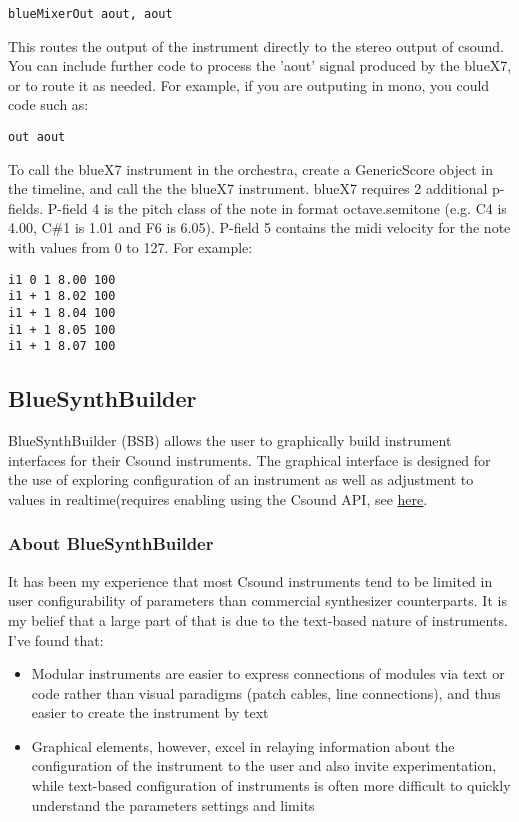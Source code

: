 \begin{verbatim}
blueMixerOut aout, aout
\end{verbatim}

This routes the output of the instrument directly to the stereo output
of csound. You can include further code to process the 'aout' signal
produced by the blueX7, or to route it as needed. For example, if you
are outputing in mono, you could code such as:

\begin{verbatim}
out aout
\end{verbatim}

To call the blueX7 instrument in the orchestra, create a GenericScore
object in the timeline, and call the the blueX7 instrument. blueX7
requires 2 additional p-fields. P-field 4 is the pitch class of the note
in format octave.semitone (e.g. C4 is 4.00, C\#1 is 1.01 and F6 is
6.05). P-field 5 contains the midi velocity for the note with values
from 0 to 127. For example:

\begin{verbatim}
i1 0 1 8.00 100
i1 + 1 8.02 100
i1 + 1 8.04 100
i1 + 1 8.05 100
i1 + 1 8.07 100
\end{verbatim}

\subsection{BlueSynthBuilder}\label{blueSynthBuilder}

BlueSynthBuilder (BSB) allows the user to graphically build instrument
interfaces for their Csound instruments. The graphical interface is
designed for the use of exploring configuration of an instrument as well
as adjustment to values in realtime(requires enabling using the Csound
API, see \protect\hyperlink{csoundAPI}{here}.

\subsubsection{About BlueSynthBuilder}

It has been my experience that most Csound instruments tend to be
limited in user configurability of parameters than commercial
synthesizer counterparts. It is my belief that a large part of that is
due to the text-based nature of instruments. I've found that:

\begin{itemize}
\item
  Modular instruments are easier to express connections of modules via
  text or code rather than visual paradigms (patch cables, line
  connections), and thus easier to create the instrument by text
\item
  Graphical elements, however, excel in relaying information about the
  configuration of the instrument to the user and also invite
  experimentation, while text-based configuration of instruments is
  often more difficult to quickly understand the parameters settings and
  limits
\end{itemize}

